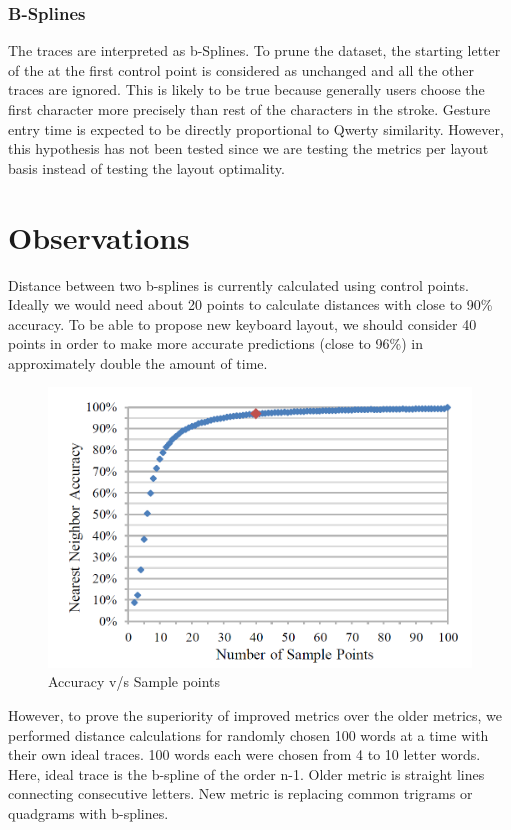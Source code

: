 \documentclass[12pt]{article}
\begin{document}
\subsubsection{B-Splines}
The traces are interpreted as b-Splines. To prune the dataset, the starting letter of the at the first control point is considered as unchanged and all the other traces are ignored. This is likely to be true because generally users choose the first character more precisely than rest of the characters in the stroke. Gesture entry time is expected to be directly proportional to Qwerty similarity. However, this hypothesis has not been tested since we are testing the metrics per layout basis instead of testing the layout optimality.

\section{Observations}
Distance between two b-splines is currently calculated using control points. Ideally we would need about 20 points to calculate distances with close to 90\% accuracy. To be able to propose new keyboard layout, we should consider 40 points in order to make more accurate predictions (close to 96\%) in approximately double the amount of time.
 
\begin{figure}[h!]
	\centering
	\includegraphics[scale=0.5]{Images/accuracy}
	\caption{Accuracy v/s Sample points }
\end{figure}

 However, to prove the superiority of improved metrics over the older metrics, we performed distance calculations for randomly chosen 100 words at a time with their own ideal traces. 100 words each were chosen from 4 to 10 letter words. Here, ideal trace is the b-spline of the order n-1. Older metric is straight lines connecting consecutive letters. New metric is replacing common trigrams or quadgrams with b-splines.
\end{document}
